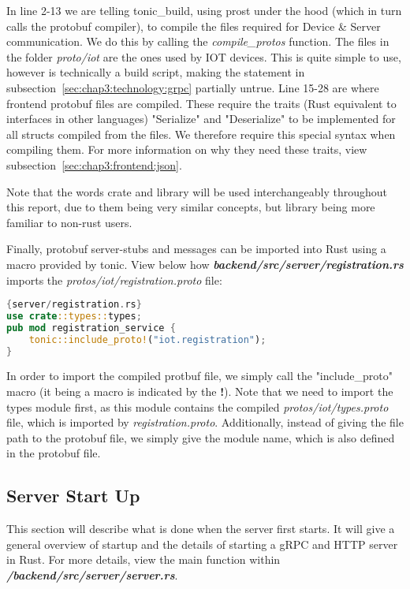 In line 2-13 we are telling tonic\_build, using prost under the hood (which in turn calls the protobuf compiler), to compile the files required for Device \& Server communication. We do this by calling the \textit{compile\_protos} function. The files in the folder \textit{proto/iot} are the ones used by IOT devices. This is quite simple to use, however is technically a build script, making the statement in subsection~\ref{sec:chap3:technology:grpc} partially untrue. Line 15-28 are where frontend protobuf files are compiled. These require the traits (Rust equivalent to interfaces in other languages) "Serialize" and "Deserialize" to be implemented for all structs compiled from the files. We therefore require this special syntax when compiling them. For more information on why they need these traits, view subsection~\ref{sec:chap3:frontend:json}.

Note that the words crate and library will be used interchangeably throughout this report, due to them being very similar concepts, but library being more familiar to non-rust users.

Finally, protobuf server-stubs and messages can be imported into Rust using a macro provided by tonic. View below how \textbf{\textit{backend/src/server/registration.rs}} imports the \textit{protos/iot/registration.proto} file:

\begin{lstlisting}[language=Rust, style=boxed]{server/registration.rs}
use crate::types::types;
pub mod registration_service {
    tonic::include_proto!("iot.registration");
}
\end{lstlisting}

In order to import the compiled protbuf file, we simply call the "include\_proto" macro (it being a macro is indicated by the \textbf{!}). Note that we need to import the types module first, as this module contains the compiled \textit{protos/iot/types.proto} file, which is imported by \textit{registration.proto}. Additionally, instead of giving the file path to the protobuf file, we simply give the module name, which is also defined in the protobuf file.

\subsection{Server Start Up} \label{sec:chap3:server:startup}
This section will describe what is done when the server first starts. It will give a general overview of startup and the details of starting a gRPC and HTTP server in Rust. For more details, view the main function within \textit{\textbf{/backend/src/server/server.rs}}.

